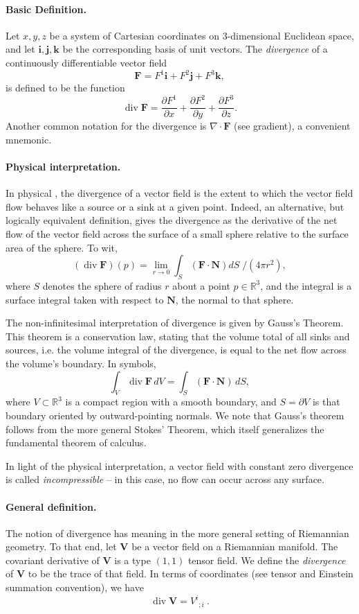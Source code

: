\documentclass[12pt]{article}
\newcommand{\reals}{\mathbb{R}}
\newcommand{\vi}{\mathbf{i}}
\newcommand{\vj}{\mathbf{j}}
\newcommand{\vk}{\mathbf{k}}
\newcommand{\vF}{\mathbf{F}}
\newcommand{\vN}{\mathbf{N}}
\newcommand{\bV}{\mathbf{V}}
\newcommand{\vnabla}{\nabla}
\newcommand{\vdiv}{\operatorname{div}}
\begin{document}
\paragraph{Basic Definition.}
Let $x,y,z$ be a system of Cartesian coordinates on $3$-dimensional
Euclidean space, and let $\vi, \vj, \vk$ be the
corresponding basis of unit vectors.  The \emph{divergence} of a continuously
differentiable vector field
$$\vF = F^1\vi+F^2\vj+F^3\vk,$$
is defined to be the function
$$\vdiv\vF=
\frac{\partial F^1}{\partial x}+
\frac{\partial F^2}{\partial y}+
\frac{\partial F^3}{\partial z}.$$
Another common notation for the divergence
is $\vnabla\cdot\vF$ (see gradient), a convenient mnemonic.

\paragraph{Physical interpretation.}
In physical , the divergence of a vector field
is the extent to which the vector field flow behaves like a source or
a sink at a given point.  Indeed, an alternative, but logically
equivalent definition, gives the divergence as the derivative of the
net flow of the vector field across the surface of a small sphere
relative to the surface area of the sphere.  To wit,
$$(\vdiv \vF)(p)= \lim_{r\rightarrow 0}
\int_{S} \!\!(\vF \cdot \vN)dS\;/\left(4 \pi r^2\right),
$$
where $S$ denotes the sphere of radius $r$ about a point
$p\in\reals^3$, and the integral is a surface integral taken with
respect to $\vN$, the normal to that sphere.  

The non-infinitesimal interpretation of divergence is given by Gauss's
Theorem. This theorem is a conservation law, stating that the volume total of
all sinks and sources, i.e. the volume integral of the divergence, is
equal to the net flow across the volume's boundary.  In symbols,
$$\int_V \vdiv \vF \, dV = \int_S (\vF\cdot \vN)\, dS,$$
where
$V\subset\reals^3$ is a compact region with a smooth boundary, and
$S=\partial V$ is that boundary oriented by outward-pointing normals.
We note that Gauss's theorem follows from the more general Stokes'
Theorem, which itself generalizes the fundamental theorem of calculus.

In light of the physical interpretation, a vector field with constant
zero divergence is called \emph{incompressible} -- in this case, no
 flow can occur across any
 surface.

\paragraph{General definition.}
The notion of divergence has meaning in the more general setting of
Riemannian geometry.  To that end, let $\bV$ be a vector field on a
Riemannian manifold.  The covariant derivative of $\bV$ is a type
$(1,1)$ tensor field. We define the \emph{divergence} of $\bV$ to be the
trace of that field.  In terms of coordinates (see tensor and Einstein
summation convention), we have
$$\vdiv \bV = V^i{}_{;i} \ .$$
\end{document}
